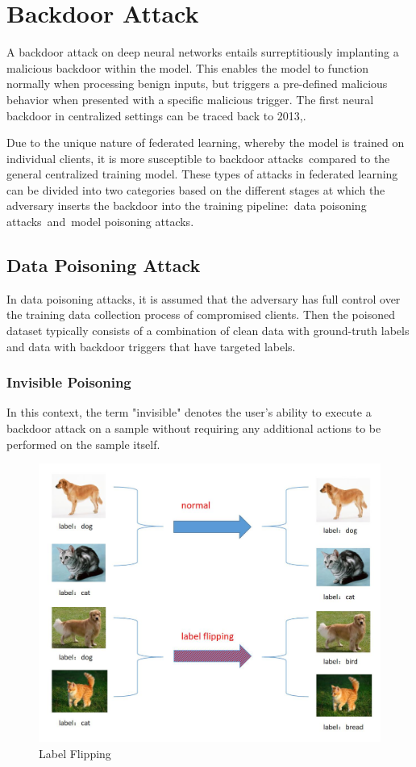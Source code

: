 \documentclass[conference]{IEEEtran}
\begin{document}
\section{Backdoor Attack}
A backdoor attack on deep neural networks entails surreptitiously implanting
a malicious backdoor within the model. This enables the model to function
normally when processing benign inputs, but triggers a pre-defined
malicious behavior when presented with a specific malicious trigger.
The first neural backdoor in centralized settings can be traced
back to 2013\cite{b52},\cite{b53}.

Due to the unique nature of federated learning, whereby the model is trained
on individual clients, it is more susceptible to backdoor attacks compared
to the general centralized training model. These types of attacks in federated
learning can be divided into two categories based on the different stages at
which the adversary inserts the backdoor into the training pipeline: data
poisoning attacks and model poisoning attacks.

\subsection{Data Poisoning Attack}
In data poisoning attacks, it is assumed that the adversary has full control
over the training data collection process of compromised clients. Then the poisoned
dataset typically consists of a combination of clean data with ground-truth labels
and data with backdoor triggers that have targeted labels.

\subsubsection{Invisible Poisoning}
In this context, the term "invisible" denotes the user's ability to execute
a backdoor attack on a sample without requiring any additional actions to
be performed on the sample itself.


\begin{figure}[htbp]
    \centerline{\includegraphics[width=0.8\linewidth,height=0.6\linewidth]{picture/f6.jpg}}
    \caption{Label Flipping}
    \label{fig6}
\end{figure}
\end{document}
